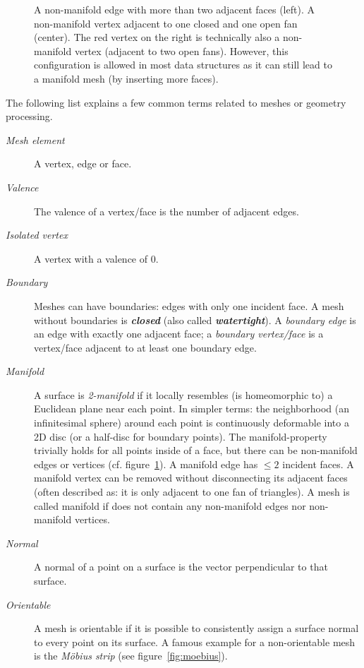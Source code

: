 \begin{figure}[t]
  
  \caption{
    A non-manifold edge with more than two adjacent faces (left).
    A non-manifold vertex adjacent to one closed and one open fan (center).
    The red vertex on the right is technically also a non-manifold vertex (adjacent to two open fans).
    However, this configuration is allowed in most data structures as it can still lead to a manifold mesh (by inserting more faces).}
  \label{fig:non-manifold}
\end{figure}

The following list explains a few common terms related to meshes or geometry processing.

\begin{description}
  \item [\emph{Mesh element}] A vertex, edge or face.
  \item [\emph{Valence}] The valence of a vertex/face is the number of adjacent edges.
  \item [\emph{Isolated vertex}] A vertex with a valence of 0.
  \item [\emph{Boundary}] Meshes can have boundaries: edges with only one incident face.
  A mesh without boundaries is \textbf{\emph{closed}} (also called \textbf{\emph{watertight}}).
  A \emph{boundary edge} is an edge with exactly one adjacent face; a \emph{boundary vertex/face} is a vertex/face adjacent to at least one boundary edge.
  \item [\emph{Manifold}] A surface is \emph{2-manifold} if it locally resembles (is homeomorphic to) a Euclidean plane near each point.
  In simpler terms: the neighborhood (an infinitesimal sphere) around each point is continuously deformable into a 2D disc (or a half-disc for boundary points).
  The manifold-property trivially holds for all points inside of a face, but there can be non-manifold edges or vertices (cf. figure~\ref{fig:non-manifold}).
  A manifold edge has $\le 2$ incident faces.
  A manifold vertex can be removed without disconnecting its adjacent faces (often described as: it is only adjacent to one fan of triangles).
  A mesh is called manifold if does not contain any non-manifold edges nor non-manifold vertices.
  \item [\emph{Normal}] A normal of a point on a surface is the vector perpendicular to that surface.
  \item [\emph{Orientable}] A mesh is orientable if it is possible to consistently assign a surface normal to every point on its surface.
  A famous example for a non-orientable mesh is the \emph{Möbius strip} (see figure~\ref{fig:moebius}).
\end{description}

